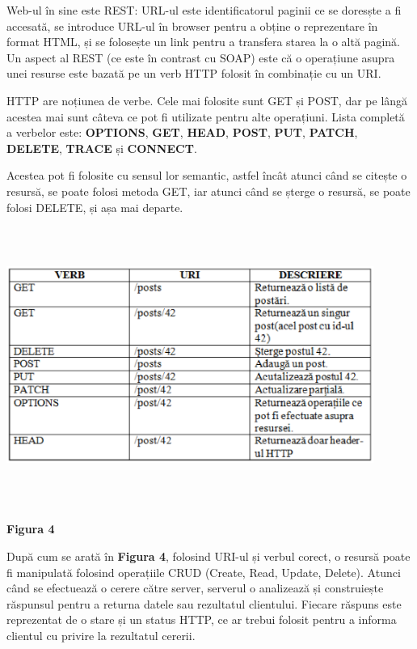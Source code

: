 Web-ul în sine este REST: URL-ul este identificatorul paginii ce se doresște a fi accesată, se introduce URL-ul în browser pentru a obține o reprezentare în format HTML, și se folosește un link pentru a transfera starea la o altă pagină.
Un aspect al REST (ce este în contrast cu SOAP) este că o operațiune asupra unei resurse este bazată pe un verb HTTP folosit în combinație cu un URI.

HTTP are noțiunea de verbe. Cele mai folosite sunt GET și POST, dar pe lângă acestea mai sunt câteva ce pot fi utilizate pentru alte operațiuni.
Lista completă a verbelor este: \textbf{OPTIONS}, \textbf{GET}, \textbf{HEAD}, \textbf{POST}, \textbf{PUT}, \textbf{PATCH}, \textbf{DELETE}, \textbf{TRACE} și \textbf{CONNECT}.

Acestea pot fi folosite cu sensul lor semantic, astfel încât atunci când se citește o resursă, se poate folosi metoda GET, iar atunci când se șterge o resursă, se poate folosi DELETE, și așa mai departe.\cite{19}

\begin{center}
\includegraphics[width=12cm,height=9cm,keepaspectratio]{imagini/TabelVerbe.eps} %
\paragraph{}
\textbf{Figura 4}
\end{center}


După cum se arată în \textbf{Figura 4}, folosind URI-ul și verbul corect, o resursă poate fi manipulată folosind operațiile CRUD (Create, Read, Update, Delete).
Atunci când se efectuează o cerere către server, serverul o analizează și construiește răspunsul pentru a returna datele sau rezultatul clientului. Fiecare răspuns este reprezentat de o stare și un status HTTP, ce ar trebui folosit pentru a informa clientul cu privire 
la rezultatul cererii.\cite{19}

